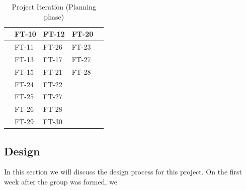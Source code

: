 \documentclass[11pt]{article}
\begin{document}
{\begin{itemize}
\begin{itemize}
\begin{table}[H]
\begin{tabular}{|m{3cm}|m{2cm}|m{2cm}|m{2cm}|m{3cm}|}
		& FT-10 & FT-12 & FT-20 & \\ \hline
		
		& FT-11 & FT-26 & FT-23 \\ \hline
		
		& FT-13 & FT-17 & FT-27 &\\ \hline
		& FT-15 & FT-21 & FT-28 &\\ \hline
		& FT-24 & FT-22 && \\ \hline
		& FT-25 & FT-27&& \\ \hline
		&FT-26  & FT-28 && \\ \hline
		& FT-29 & FT-30 && \\ \hline
	
		\end{tabular}
		\caption{Project Iteration (Planning phase)}
		\label{table:iteration} 
		\end{table}
		
    
    \end{itemize}

  
	
\subsection{Design}
In this section we will discuss the design process for this project. On the first week after the group was formed, we 





\begin{center}

		
		
		
		
		

\end{center}
\end{itemize}}
\end{document}

